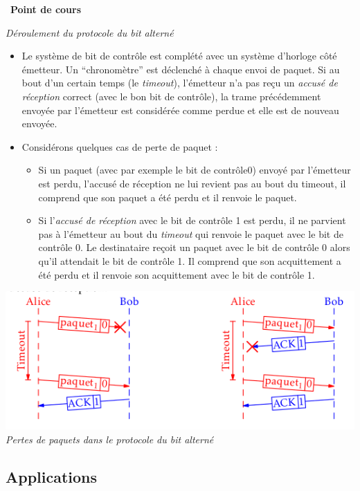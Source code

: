 \documentclass[
  11pt,
]{article}
\providecommand{\tightlist}{%
  \setlength{\itemsep}{0pt}\setlength{\parskip}{0pt}}
\newcounter{cours}
\newenvironment{cours}[1]
{\par \medskip   \addtocounter{cours}{1} \noindent  
\begin{bclogo}[arrondi =0.1,  ombre = true, barre=none, logo=\bcbook, marge=4]{~\textbf{Point de cours} \textbf{\thecours} {\itshape #1} }  \par}
{
\end{bclogo}
 \par \bigskip }
\begin{document}
\begin{cours}{}
\emph{Déroulement du protocole du bit alterné}

\begin{itemize}
\item
  Le système de bit de contrôle est complété avec un système d'horloge
  côté émetteur. Un ``chronomètre'' est déclenché à chaque envoi de
  paquet. Si au bout d'un certain temps (le \emph{timeout}), l'émetteur
  n'a pas reçu un \emph{accusé de réception} correct (avec le bon bit de
  contrôle), la trame précédemment envoyée par l'émetteur est considérée
  comme perdue et elle est de nouveau envoyée.
\item
  Considérons quelques cas de perte de paquet :

  \begin{itemize}
  \tightlist
  \item
    Si un paquet (avec par exemple le bit de contrôle0) envoyé par
    l'émetteur est perdu, l'accusé de réception ne lui revient pas au
    bout du timeout, il comprend que son paquet a été perdu et il
    renvoie le paquet.
  \item
    Si l'\emph{accusé de réception} avec le bit de contrôle 1 est perdu,
    il ne parvient pas à l'émetteur au bout du \emph{timeout} qui
    renvoie le paquet avec le bit de contrôle 0. Le destinataire reçoit
    un paquet avec le bit de contrôle 0 alors qu'il attendait le bit de
    contrôle 1. Il comprend que son acquittement a été perdu et il
    renvoie son acquittement avec le bit de contrôle 1.
  \end{itemize}
\end{itemize}

\includegraphics{images/bit_alterne2.png}\\

\emph{Pertes de paquets dans le protocole du bit alterné}

\end{cours}

\hypertarget{applications}{%
\subsection{Applications}\label{applications}}
\end{document}
